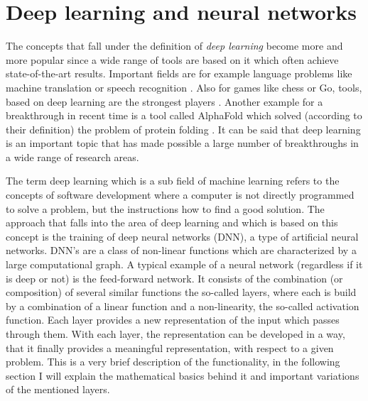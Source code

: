\chapter{Deep learning and neural networks}
The concepts that fall under the definition of \textit{deep learning} become more and more popular since a wide range of tools are based on it which often achieve state-of-the-art results. Important fields are for example language problems like machine translation \cite{liu_very_2020} or speech recognition \cite{amodei_deep_2015}. Also for games like chess or Go, tools, based on deep learning are the strongest players \cite{schrittwieser_mastering_2020}. Another example for a breakthrough in recent time is a tool called AlphaFold which \glqq solved\grqq{} (according to their definition) the problem of protein folding \cite{alphafold}. It can be said that deep learning is an important topic that has made possible a large number of breakthroughs in a wide range of research areas.

The term deep learning which is a sub field of machine learning refers to the concepts of software development where a computer is not directly programmed to solve a problem, but the instructions how to find a good solution. 
The approach that falls into the area of deep learning and which is based on this concept is the training of deep neural networks (DNN), a type of artificial neural networks. DNN's are a class of non-linear functions which are characterized by a large computational graph. A typical example of a neural network (regardless if it is deep or not) is the feed-forward network. It consists of the combination (or composition) of several similar functions the so-called layers, where each is build by a combination of a linear function and a non-linearity, the so-called activation function. Each layer provides a new representation of the input which passes through them. With each layer, the representation can be developed in a way, that it finally provides a meaningful representation, with respect to a given problem. This is a very brief description of the functionality, in the following section I will explain the mathematical basics behind it and important variations of the mentioned layers. 




